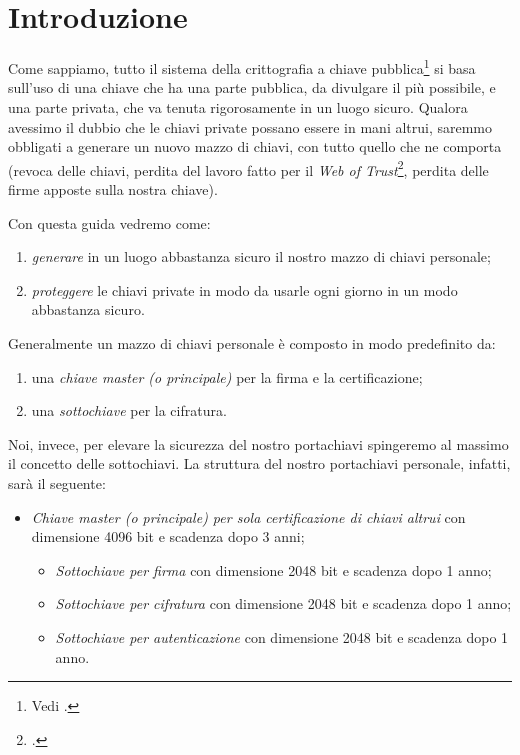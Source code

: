 \section{Introduzione}

Come sappiamo, tutto il sistema della crittografia a chiave
pubblica\footnote{Vedi \cite{wiki:crittografia}.} si basa sull'uso di una chiave
che ha una parte pubblica, da divulgare il più possibile, e una parte privata,
che va tenuta rigorosamente in un luogo sicuro. Qualora avessimo il dubbio che
le chiavi private possano essere in mani altrui, saremmo obbligati a generare un
nuovo mazzo di chiavi, con tutto quello che ne comporta (revoca delle chiavi,
perdita del lavoro fatto per il \emph{Web of
Trust}\footnote{\cite{wiki:webtrust}.}, perdita delle firme apposte sulla nostra
chiave).

Con questa guida vedremo come:

\begin{enumerate}
  \item \emph{generare} in un luogo abbastanza sicuro il nostro mazzo di chiavi
  personale;
  \item \emph{proteggere} le chiavi private in modo da usarle ogni giorno in un
 modo abbastanza sicuro.
\end{enumerate}

Generalmente un mazzo di chiavi personale è composto in modo
predefinito da:

\begin{enumerate}
  \item una \emph{chiave master (o principale)} per la firma e la
  certificazione;
  \item una \emph{sottochiave} per la cifratura.
\end{enumerate}

Noi, invece, per elevare la sicurezza del nostro portachiavi
spingeremo al massimo il concetto delle sottochiavi. La struttura del nostro
portachiavi personale, infatti, sarà il seguente:

\begin{itemize}
  \item \emph{Chiave master (o principale) per sola certificazione di chiavi
  altrui} con dimensione 4096 bit e scadenza dopo 3 anni;
  \begin{itemize}
    \item \emph{Sottochiave per firma} con dimensione 2048 bit e scadenza dopo 1
    anno;
    \item \emph{Sottochiave per cifratura} con dimensione 2048 bit e scadenza
    dopo 1 anno;
    \item \emph{Sottochiave per autenticazione} con dimensione 2048 bit e
    scadenza dopo 1 anno.
  \end{itemize}
\end{itemize}

